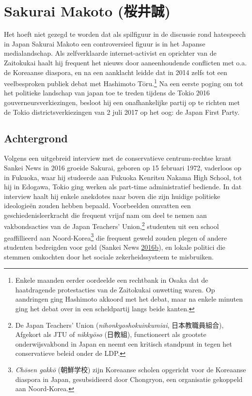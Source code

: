 \documentclass[10.5pt,dutch,]{article}
\begin{document}
\newpage

\section{Sakurai Makoto
(桜井誠)}\label{sakurai-makoto-ux685cux4e95ux8aa0}

Het hoeft niet gezegd te worden dat als spilfiguur in de discussie rond
hatespeech in Japan Sakurai Makoto een controversieel figuur is in het
Japanse medialandschap. Als zelfverklaarde internet-activist en
oprichter van de Zaitokukai haalt hij frequent het nieuws door
aaneenhoudende conflicten met o.a. de Koreaanse diaspora, en na een
aanklacht leidde dat in 2014 zelfs tot een veelbesproken publiek debat
met Hashimoto Tōru.\footnote{Enkele maanden eerder oordeelde een
  rechtbank in Osaka dat de haatdragende protestacties van de Zaitokukai
  onwetting waren. Op aandringen ging Hashimoto akkoord met het debat,
  maar na enkele minuten ging het debat over in een scheldpartij langs
  beide kanten.} Na een eerste poging om tot het politieke landschap van
japan toe te treden tijdens de Tokio 2016 gouverneursverkiezingen,
besloot hij een onafhankelijke partij op te richten met de Tokio
districtsverkiezingen van 2 juli 2017 op het oog: de Japan First Party.

\subsection{Achtergrond}\label{achtergrond}

Volgens een uitgebreid interview met de conservatieve centrum-rechtse
krant Sankei News in 2016 groeide Sakurai, geboren op 15 februari 1972,
vaderloos op in Fukuoka, waar hij studeerde aan Fukuoka Kenritsu Nakama
High School, tot hij in Edogawa, Tokio ging werken als part-time
administratief bediende. In dat interview haalt hij enkele anekdotes
naar boven die zijn huidige politieke ideologieën zouden hebben bepaald.
Voorbeelden omvatten een geschiedenisleerkracht die frequent vrijaf nam
om deel te nemen aan vakbondsacties van de Japan Teachers'
Union,\footnote{De Japan Teachers' Union (\emph{nihonkyoshokuinkumiai},
  日本教職員組合), Afgekort als JTU of \emph{nikkyōso} (日教組),
  functioneert als grootste onderwijsvakbond in Japan en neemt een
  kritisch standpunt in tegen het conservatieve beleid onder de LDP.}
studenten uit een school geaffillieerd aan Noord-Korea\footnote{\emph{Chōsen
  gakkō} (朝鮮学校) zijn Koreaanse scholen opgericht voor de Koreaanse
  diaspora in Japan, gesubsidieerd door Chongryon, een organisatie
  gekoppeld aan Noord-Korea.} die frequent geweld zouden plegen of
andere studenten bedreigden voor geld (Sankei News
\protect\hyperlink{ref-sankeiux5fnewsux5ftokyochiji-senux5f2016-1}{2016}\protect\hyperlink{ref-sankeiux5fnewsux5ftokyochiji-senux5f2016-1}{b}),
en lokale politici die stemmen omkochten door het sociale
zekerheidssysteem te misbruiken.
\end{document}
